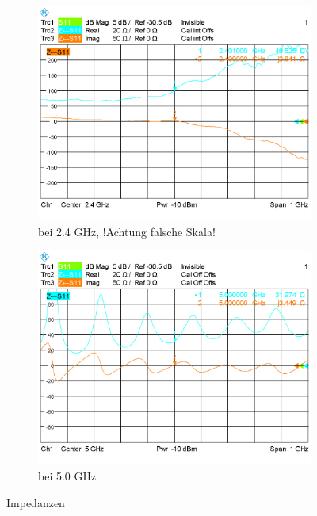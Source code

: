 \begin{figure}[h!]
	\begin{center}
		\begin{subfigure}[t]{0.49\textwidth}
			\begin{center}
				\includegraphics[width=1\textwidth]{../fig/plt/IMP_WITH_2_4.PNG}
				\caption{bei 2.4 GHz, !Achtung falsche Skala!}
				\label{fig:Imp_with_full_2.4}
			\end{center}
		\end{subfigure}
		\begin{subfigure}[t]{0.49\textwidth}
			\begin{center}
				\includegraphics[width=1\textwidth]{../fig/plt/IMP_WITH_5_0.PNG}
				\caption{bei 5.0 GHz}
				\label{fig:Imp_with_full_5.0}
			\end{center}
		\end{subfigure}
		\caption{Impedanzen}
		\label{fig:Imp_each}
	\end{center}
\end{figure}

